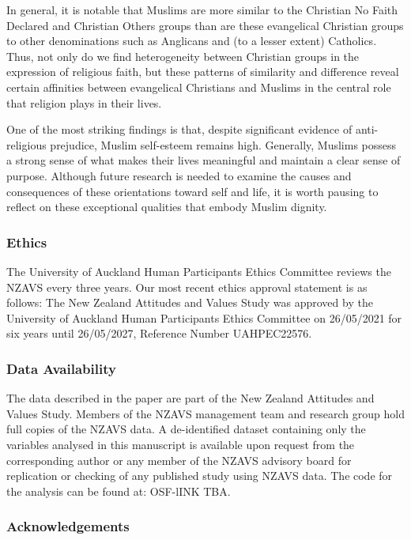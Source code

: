 \documentclass[
  single column]{article}
\begin{document}
In general, it is notable that Muslims are more similar to the Christian
No Faith Declared and Christian Others groups than are these evangelical
Christian groups to other denominations such as Anglicans and (to a
lesser extent) Catholics. Thus, not only do we find heterogeneity
between Christian groups in the expression of religious faith, but these
patterns of similarity and difference reveal certain affinities between
evangelical Christians and Muslims in the central role that religion
plays in their lives.

One of the most striking findings is that, despite significant evidence
of anti-religious prejudice, Muslim self-esteem remains high. Generally,
Muslims possess a strong sense of what makes their lives meaningful and
maintain a clear sense of purpose. Although future research is needed to
examine the causes and consequences of these orientations toward self
and life, it is worth pausing to reflect on these exceptional qualities
that embody Muslim dignity.

\subsubsection{Ethics}\label{ethics}

The University of Auckland Human Participants Ethics Committee reviews
the NZAVS every three years. Our most recent ethics approval statement
is as follows: The New Zealand Attitudes and Values Study was approved
by the University of Auckland Human Participants Ethics Committee on
26/05/2021 for six years until 26/05/2027, Reference Number UAHPEC22576.

\subsubsection{Data Availability}\label{data-availability}

The data described in the paper are part of the New Zealand Attitudes
and Values Study. Members of the NZAVS management team and research
group hold full copies of the NZAVS data. A de-identified dataset
containing only the variables analysed in this manuscript is available
upon request from the corresponding author or any member of the NZAVS
advisory board for replication or checking of any published study using
NZAVS data. The code for the analysis can be found at: OSF-lINK TBA.

\subsubsection{Acknowledgements}\label{acknowledgements}
\end{document}
